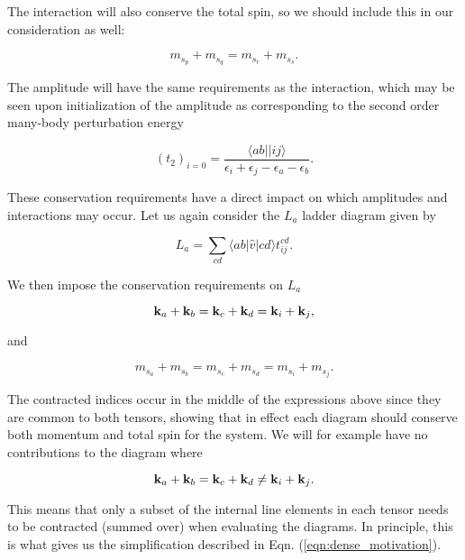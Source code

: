 The interaction will also conserve the total spin, so we should include this in our consideration as well:

\begin{equation}
m_{s_p}+  m_{s_q}=  m_{s_r} +m_{s_s}.
\label{eqn:spinconservation}
\end{equation}

The amplitude will have the same requirements as the interaction, which may be seen upon initialization of the amplitude as corresponding to the second order many-body perturbation energy

\begin{equation}
(t_2)_{i=0} = \frac{\langle ab \vert \vert ij \rangle  }{\epsilon_i + \epsilon_j - \epsilon_a - \epsilon_b}.
\end{equation}

These conservation requirements have a direct impact on which amplitudes and interactions may occur. Let us again consider the $L_a$ ladder diagram given by

\begin{equation}
L_a = \sum_{cd} \langle a b \vert \hat{v}\vert c d \rangle t^{cd}_{ij}.
\end{equation}

We then impose the conservation requirements on $L_a$

\begin{equation}
\bold{k}_a + \bold{k}_b = \bold{k}_c + \bold{k}_d =  \bold{k}_i + \bold{k}_j,
\end{equation}

and

\begin{equation}
m_{s_a}+  m_{s_b}=  m_{s_c} +m_{s_d} = m_{s_i} + m_{s_j}.
\end{equation}

The contracted indices occur in the middle of the expressions above since they are common to both tensors, showing that in effect each diagram should conserve both momentum and total spin for the system. We will for example have no contributions to the diagram where

\begin{equation}
\bold{k}_a + \bold{k}_b = \bold{k}_c + \bold{k}_d \neq  \bold{k}_i + \bold{k}_j.
\end{equation}

This means that only a subset of the internal line elements in each tensor needs to be contracted (summed over) when evaluating the diagrams. In principle, this is what gives us the simplification described in Eqn. (\ref{eqn:dense_motivation}).

